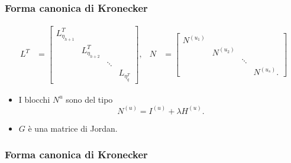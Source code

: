 \begin{frame}
	\frametitle{Forma canonica di Kronecker}
	\begin{align*}
		L^T &= \left[\begin{smallmatrix}
			L_{\eta_{h+1}}^T \\
			& L_{\eta_{h+2}}^T \\
			& & \ddots \\
			& & & L_{\eta_{q}^T}
		\end{smallmatrix}\right], &
		N &= \left[\begin{smallmatrix}
			N^{(u_{1})} \\
			& N^{(u_{2})} \\ 
			& & \ddots \\
			& & & N^{(u_{s})}.
		\end{smallmatrix}\right]
	\end{align*}
	\begin{itemize}
		\item {} I blocchi $N^{u}$ sono del tipo
		\[N^{(u)} = I^{(u)} + \lambda H^{(u)}.\]
		\item {} $G$ \`e una matrice di Jordan.
	\end{itemize}
\end{frame}


\begin{frame}
	\frametitle{Forma canonica di Kronecker}
\end{frame}

